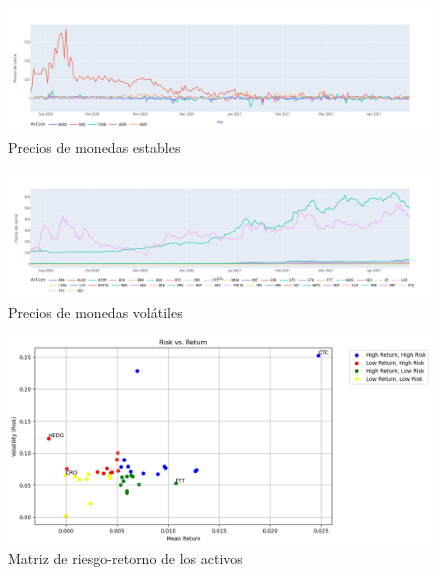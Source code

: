 \documentclass[runningheads,legalpaper,10pt]{etc/llncs}
\begin{document}
\begin{figure}[htp]
    \centering
    \includegraphics[scale=0.3]{images/stablecoins_lineplot.png}
    \caption{Precios de monedas estables}
    \label{fig:stablecoins}
\end{figure}

\begin{figure}[htp]
    \raggedleft
    \includegraphics[scale=0.3]{images/volatilecoins_lineplot.png}
    \caption{Precios de monedas volátiles}
    \label{fig:volatile}
\end{figure}

\begin{figure}[htp]
    \includegraphics[scale=0.6]{images/risk_matrix.png}
    \caption{Matriz de riesgo-retorno de los activos}
    \label{fig:risk_matrix}
\end{figure}
\end{document}
